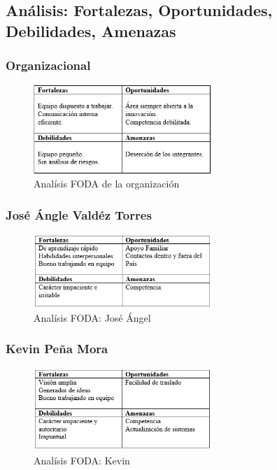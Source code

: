 \documentclass[]{article}
\begin{document}
\subsection{An\'alisis: Fortalezas, Oportunidades, Debilidades, Amenazas}

\subsubsection{Organizacional}
\begin{figure}[H]
	
	\centering
	\includegraphics[width=0.6\textwidth]{org}
	\caption{Anal\'isis FODA de la organizaci\'on}
	
\end{figure}


\subsubsection{Jos\'e \'Angle Vald\'ez Torres }
\begin{figure}[H]
	
	\centering
	\includegraphics[width=0.6\textwidth]{jose}
	\caption{Anal\'isis FODA: Jos\'e \'Angel}
	
\end{figure}
\subsubsection{Kevin Pe\~na Mora}
\begin{figure}[H]
	
	\centering
	\includegraphics[width=0.6\textwidth]{kevin}
	\caption{Anal\'isis FODA: Kevin}
	
\end{figure}
\end{document}
